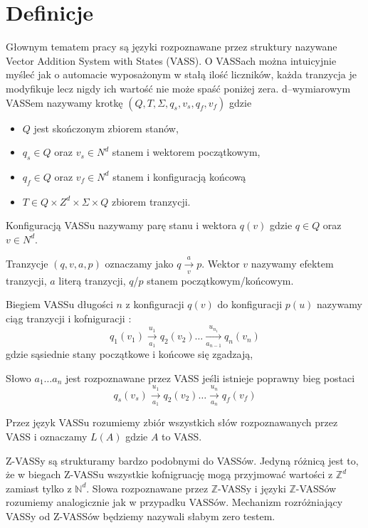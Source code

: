     \section{Definicje}
    Głownym tematem pracy są języki rozpoznawane przez struktury nazywane Vector Addition System with States (VASS).
    O VASSach można intuicyjnie myśleć jak o automacie wyposażonym w stałą ilość liczników, każda tranzycja je modyfikuje
    lecz nigdy ich wartość nie może spaść poniżej zera.
    d--wymiarowym VASSem nazywamy krotkę $(Q,T,\Sigma,q_s,v_s,q_f,v_f)$ gdzie
    \begin{itemize}
        \item     $Q$ jest skończonym zbiorem stanów,
        \item     $q_s \in Q$ oraz $v_s \in N^d$ stanem i wektorem początkowym,
        \item     $q_f \in Q$ oraz $v_f \in N^d$ stanem i konfiguracją końcową
        \item      $T \in Q \times Z^d \times \Sigma \times Q$ zbiorem tranzycji.
    \end{itemize}
    Konfiguracją VASSu nazywamy parę stanu i wektora $q(v)$ gdzie $q \in Q$ oraz  $v \in N^d$.


    Tranzycje $(q,v,a,p)$ oznaczamy jako $q \xrightarrow[v]{a} p $. Wektor $v$ nazywamy efektem tranzycji,
    $a$ literą tranzycji, $q$/$p$ stanem początkowym/końcowym.


    Biegiem VASSu długości $n$ z konfiguracji $q(v)$ do konfiguracji $p(u)$ nazywamy ciąg tranzycji i kofniguracji :
    \[q_1(v_1) \xrightarrow[a_1]{u_1} q_2(v_2) \dots \xrightarrow[a_{n-1}]{u_{n_1}} q_n(v_n) \] gdzie
    sąsiednie stany początkowe i końcowe się zgadzają,

    Słowo $a_1 \dots a_n$ jest rozpoznawane przez VASS jeśli istnieje poprawny bieg postaci
    \[q_s(v_s) \xrightarrow[a_1]{u_1} q_2(v_2) \dots \xrightarrow[a_{n}]{u_{n}} q_f(v_f) \]


    Przez język VASSu rozumiemy zbiór wszystkich słów rozpoznawanych przez VASS i oznaczamy $L(A)$ gdzie $A$ to VASS.


    Z-VASSy są strukturamy bardzo podobnymi do VASSów.
    Jedyną różnicą jest to, że w biegach Z-VASSu wszystkie kofnigruację mogą przyjmować wartości z $\mathbb{Z}^d$ zamiast tylko z $\mathbb{N}^d$.
    Słowa rozpoznawane przez $\mathbb{Z}$-VASSy i języki $\mathbb{Z}$-VASSów rozumiemy analogicznie jak w przypadku VASSów.
    Mechanizm rozróżniający VASSy od Z-VASSów będziemy nazywali słabym zero testem.

